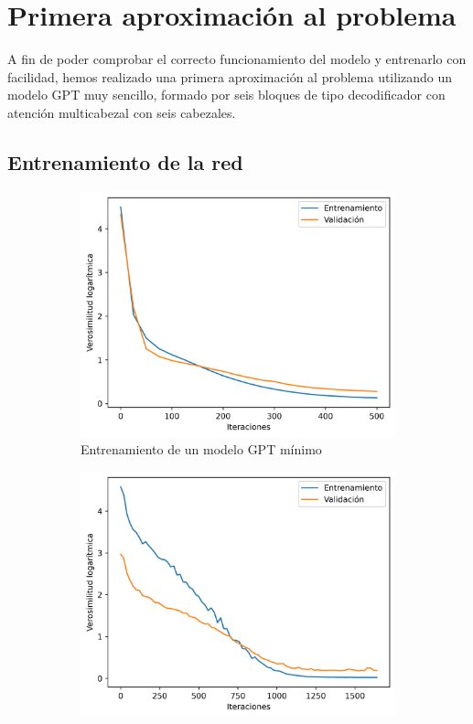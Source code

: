 \section{Primera aproximación al problema}
A fin de poder comprobar el correcto funcionamiento del modelo y entrenarlo con facilidad, hemos realizado una primera aproximación al problema utilizando un modelo  GPT muy sencillo, formado por seis bloques de tipo decodificador con atención multicabezal con seis cabezales.

\subsection{Entrenamiento de la red}
\begin{figure}[tb]
    \centering
    \begin{subfigure}[b]{0.49\textwidth}
        \centering
        \includegraphics[width=\textwidth]{figures/chapter5/mini_loss.png}
        \caption{Entrenamiento de un modelo GPT mínimo}
        \label{fig:loss}
    \end{subfigure}
    \begin{subfigure}[b]{0.49\textwidth}
        \centering
        \includegraphics[width=\textwidth]{figures/chapter5/loss.png}

\end{subfigure}
\end{figure}
